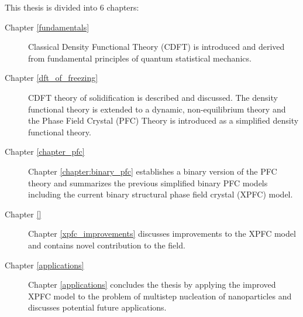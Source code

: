 \label{chapter:introduction}












This thesis is divided into 6 chapters:
%
\begin{description}
    \item [Chapter \ref{fundamentals}] { 
Classical Density Functional Theory (CDFT) is introduced and derived
from fundamental principles of quantum statistical mechanics.
    }
    \item [Chapter \ref{dft_of_freezing}] {
CDFT theory of solidification is described and discussed. The density
functional theory is extended to a dynamic, non-equilibrium theory 
and the Phase Field Crystal (PFC) Theory is introduced as a simplified
density functional theory.
    }
    \item [Chapter \ref{chapter_pfc}] {
Chapter \ref{chapter:binary_pfc} establishes a binary version of the PFC theory
and summarizes the previous simplified binary PFC models including the current
binary structural phase field crystal (XPFC) model.
    }
    \item [Chapter \ref{}] {
Chapter \ref{xpfc_improvements} discusses improvements to the XPFC model and
contains novel contribution to the field.
    }
    \item [Chapter \ref{applications}] {
Chapter \ref{applications} concludes the thesis by applying the improved XPFC
model to the problem of multistep nucleation of nanoparticles and discusses
potential future applications.
    } 
\end{description}
%


